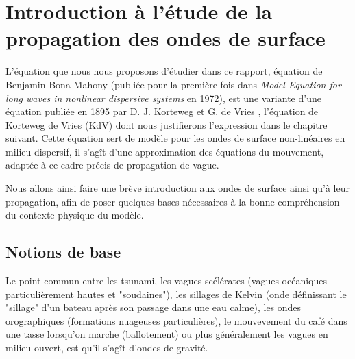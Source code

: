 \chapter{Introduction à l'étude de la propagation des ondes de surface}

L'équation que nous nous proposons d'étudier dans ce rapport, équation de Benjamin-Bona-Mahony (publiée pour la première fois dans \textit{Model Equation for long waves in nonlinear dispersive systems} \cite{BBM} en 1972), est une variante d'une équation publiée en 1895 par D. J. Korteweg et G. de Vries \cite{KdV}, l'équation de Korteweg de Vries (KdV) dont nous justifierons l'expression dans le chapitre suivant.
Cette équation sert de modèle pour les ondes de surface non-linéaires en milieu dispersif, il s'agît d'une approximation des équations du mouvement, adaptée à ce cadre précis de propagation de vague.

Nous allons ainsi faire une brève introduction aux ondes de surface ainsi qu'à leur propagation, afin de poser quelques bases nécessaires à la bonne compréhension du contexte physique du modèle.

\section{Notions de base}


Le point commun entre les tsunami, les vagues scélérates (vagues océaniques particulièrement hautes et "soudaines"), les sillages de Kelvin (onde définissant le "sillage" d'un bateau après son passage dans une eau calme), les ondes orographiques (formations nuageuses particulières), le mouvevement du café dans une tasse lorsqu'on marche (ballotement) ou plus généralement les vagues en milieu ouvert, est qu'il s'agît d'ondes de gravité. 



